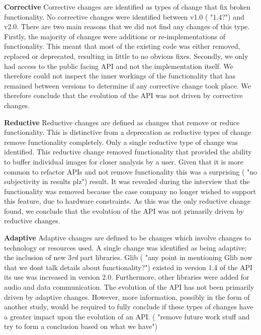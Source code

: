 \documentclass{sig-alternate}
\begin{document}
\smallskip \noindent
\textbf{Corrective  }
Corrective changes are identified as types of change that fix broken functionality.
No corrective changes were identified between v1.0 ( "1.4?") and v2.0. There are two main reasons that we did not find any changes of this type. Firstly, the majority of changes were additions or re-implementations of functionality. This meant that most of the existing code was either removed, replaced or deprecated, resulting in little to no obvious fixes. Secondly, we only had access to the public facing API and not the implementation itself. We therefore could not inspect the inner workings of the functionality that has remained between versions to determine if any corrective change took place.
We therefore conclude that the evolution of the API was not driven by corrective changes.

\smallskip \noindent
\textbf{Reductive  }
Reductive changes are defined as changes that remove or reduce functionality. This is distinctive from a deprecation as reductive types of change remove functionality completely.
Only a single reductive type of change was identified. This reductive change removed functionality that provided the ability to buffer individual images for closer analysis by a user. Given that it is more common to refactor APIs and not remove functionality \cite{dig2005role, xing2006refactoring} this was a surprising ( "no subjectivity in results plz") result. 
It was revealed during the interview that the functionality was removed because the case company no longer wished to support this feature, due to hardware constraints. 
As this was the only reductive change found, we conclude that the evolution of the API was not primarily driven by reductive changes.

\smallskip \noindent
\textbf{Adaptive  }
Adaptive changes are defined to be changes which involve changes to technology or resources used. 
A single change was identified as being adaptive; the inclusion of new 3\textit{rd} part libraries. Glib \cite{Glib} ( "any point in mentioning Glib now that we dont talk details about functionality?") existed in version 1.4 of the API its use was increased in version 2.0. Furthermore, other libraries were added for audio and data communication.
The evolution of the API has not been primarily driven by adaptive changes. However, more information, possibly in the form of another study, would be required to fully conclude if these types of changes have a greater impact upon the evolution of an API. ( "remove future work stuff and try to form a conclusion based on what we have")
\end{document}
